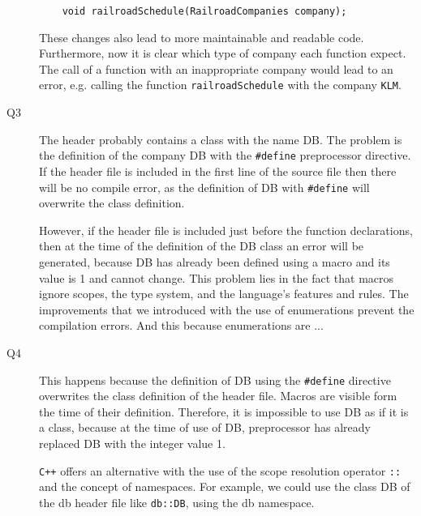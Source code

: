 \documentclass[a4paper]{article}
\newcounter{exerciseCount}
\newcommand{\exercise}[1]{\addtocounter{exerciseCount}{1} \noindent \medskip {\large \textsf{\textbf{Exercise \arabic{exerciseCount} #1}}} \par}
\begin{document}
\begin{description}
\begin{verbatim}
	void railroadSchedule(RailroadCompanies company);
	\end{verbatim}
	
	These changes also lead to more maintainable and readable code. Furthermore, now it is clear which type of company each function expect. The call of a function with an inappropriate company would lead to an error, e.g. calling the function \verb|railroadSchedule| with the company \verb|KLM|.
	\item[Q3]\-
	The header probably contains a class with the name DB. The problem is the definition of the company DB with the \verb|#define| preprocessor directive. If the header file is included in the first line of the source file then there will be no compile error, as the definition of DB with \verb|#define| will overwrite the class definition.
	
	However, if the header file is included just before the function declarations, then at the time of the definition of the DB class an error will be generated, because DB has already been defined using a macro and its value is 1 and cannot change. This problem lies in the fact that macros ignore scopes, the type system, and the language's features and rules. The improvements that we introduced with the use of enumerations prevent the compilation errors. And this because enumerations are ...
	\item[Q4]\-
	This happens because the definition of DB using the \verb|#define| directive overwrites the class definition of the header file. Macros are visible form the time of their definition. Therefore, it is impossible to use DB as if it is a class, because at the time of use of DB, preprocessor has already replaced DB with the integer value 1.
	
	\verb|C++| offers an alternative with the use of the scope resolution operator \verb|::| and the concept of namespaces. For example, we could use the class DB of the db header file like \verb|db::DB|, using the db namespace.
\end{description}

\exercise{}
\end{document}
